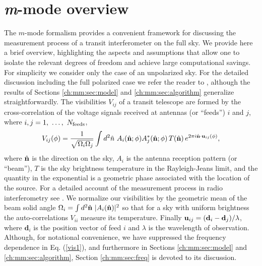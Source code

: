 \section{\textit{m}-mode overview}
\label{ch:mm:sec:mmo}

The $m$-mode formalism provides a convenient framework for discussing the measurement process of a transit interferometer on the full sky. We provide here a brief overview, highlighting the aspects and assumptions that allow one to isolate the relevant degrees of freedom and achieve large computational savings. For simplicity we consider only the case of an unpolarized sky. For the detailed discussion including the full polarized case we refer the reader to \cite{mmodes2}, although the results of Sections \ref{ch:mm:sec:model} and \ref{ch:mm:sec:algorithm} generalize straightforwardly. The visibilities $V_{ij}$ of a transit telescope are formed by the cross-correlation of the voltage signals received at antennas (or ``feeds'') $i$ and $j$, where $i,j=1,~\dots,~N_{\rm feeds}$,
\begin{equation}
V_{ij}(\phi) = \frac{1}{\sqrt{\Omega_{i}\Omega_{j}}} \int d^2\hat{n} ~ A_i(\hat{\mathbf{n}}; \phi) A^*_j(\hat{\mathbf{n}}; \phi) \, T(\hat{\mathbf{n}}) \, e^{2\pi i\hat{\mathbf{n}} \cdot \mathbf{u}_{ij}(\phi)},
\label{vis1}
\end{equation}
 where $\hat{\mathbf{n}}$ is the direction on the sky, $A_i$ is the antenna reception pattern (or ``beam''), $T$ is the sky brightness temperature in the Rayleigh-Jeans limit, and the quantity in the exponential is a geometric phase associated with the location of the source. For a detailed account of the measurement process in radio interferometry see \cite{radio1}. We normalize our visibilities by the geometric mean of the beam solid angle $\Omega_i =\int d^2\hat{\mathbf{n}}~|A_i({\hat{\mathbf{n}}})|^2$ so that for a sky with uniform brightness the auto-correlations $V_{ii}$ measure its temperature. Finally ${\bf u}_{ij} = (\mathbf{d}_{i} - \mathbf{d}_{j})/\lambda$, where $\mathbf{d}_{i}$ is the position vector of feed $i$ and $\lambda$ is the wavelength of observation. Although, for notational convenience, we have suppressed the frequency dependence in Eq. (\ref{vis1}), and furthermore in Sections \ref{ch:mm:sec:model} and \ref{ch:mm:sec:algorithm}, Section \ref{ch:mm:sec:freq} is devoted to its discussion.

